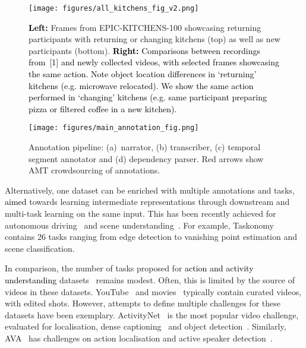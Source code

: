 \documentclass[twocolumn]{svjour3}          \smartqed
\newcommand{\edits}[1]{\textcolor{black}{#1}}
\begin{document}
\begin{figure*}[t]
    \centering
    \texttt{[image: figures/all\_kitchens\_fig\_v2.png]}
    \caption{\edits{\textbf{Left:}} Frames from EPIC-KITCHENS-100 showcasing returning participants with returning or changing kitchens (top) as well as new participants (bottom). \edits{\textbf{Right:} Comparisons between recordings from~[1] and newly collected videos, with selected frames showcasing the same action. 
    Note object location differences in `returning' kitchens (e.g. microwave relocated). We show the same action performed in `changing' kitchens (e.g. same participant preparing pizza or filtered coffee in a new kitchen).}}
    \label{fig:kitchen_examples}
\end{figure*}

\begin{figure*}[htb]
    \centering
    \texttt{[image: figures/main\_annotation\_fig.png]}
    \caption{Annotation pipeline: (a)~narrator, (b) transcriber, (c) temporal segment annotator  and (d) dependency parser. Red arrows show AMT crowdsourcing of annotations.}
    \label{fig:main_annotation}
\end{figure*}

Alternatively, one dataset can be enriched with multiple annotations and tasks, \edits{aimed} towards learning intermediate representations through downstream and multi-task learning on the same input.  This has been recently achieved for autonomous driving~\cite{zhou2019does,geiger2012we,Cordts2016Cityscapes,neuhold2017mapillary,yu2018bdd100k,huang2018apolloscape,nuscenes2019,yogamani2019woodscape} and scene understanding~\cite{zamir2018taskonomy,silberman2012indoor}.
For example, 
Taskonomy~\cite{zamir2018taskonomy} contains 26 tasks ranging from edge detection to vanishing point estimation and scene classification. 

In comparison, the number of tasks proposed for \edits{action and activity understanding} datasets~\cite{Damen2018EPICKITCHENS,gu2018ava,caba2015activitynet,rohrbach2015dataset,zhou2017procnets,Rohrbach2012} remains modest.
Often, this is limited by the source of videos in these datasets. YouTube~\cite{caba2015activitynet,zhou2017procnets} and movies~\cite{gu2018ava,rohrbach2015dataset} typically contain curated videos, with edited shots.
However, attempts to define multiple challenges for these datasets have been exemplary. ActivityNet~\cite{caba2015activitynet} is the most popular video challenge, evaluated for localisation, dense captioning~\cite{krishna2017dense} and object detection~\cite{zhou2019grounded}.
Similarly, AVA~\cite{gu2018ava} has  challenges on action localisation and active speaker detection~\cite{roth2019ava}.
\end{document}
